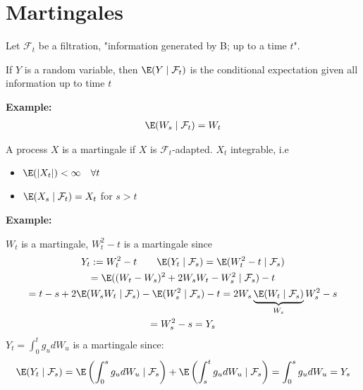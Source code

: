 \section{Martingales}
Let $\mathcal{F}_t$ be a filtration, "information generated by B; up to a time $t$".\par
\noindent If $Y$ is a random variable, then $\E(Y\mid \mathcal{F}_t)$ is the conditional expectation given all information up to time $t$
\par\bigskip
\noindent\textbf{Example:}
\begin{equation*}
  \begin{gathered}
    \E(W_s\mid\mathcal{F}_t) = W_t
  \end{gathered}
\end{equation*}
\par\bigskip
\begin{defo}[Martingale]{} 
  A process $X$ is a martingale if $X$ is $\mathcal{F}_t$-adapted. $X_t$ integrable, i.e\par
  \begin{itemize}
    \item $\E(\left|X_t\right|)<\infty\quad\forall t$
    \item $\E(X_s\mid\mathcal{F}_t) = X_t$ for $s>t$
  \end{itemize}
\end{defo}
\par\bigskip
\noindent\textbf{Example:}\par
\noindent $W_t$ is a martingale, $W_t^2-t$ is a martingale since
\begin{equation*}
  \begin{gathered}
    Y_t := W_t^2-t\qquad \E(Y_t\mid\mathcal{F}_s) = \E(W_t^2-t\mid\mathcal{F}_s)\\
    = \E((W_t-W_s)^2+2W_sW_t-W_s^2\mid\mathcal{F}_s)-t\\
    = t-s+2\E(W_sW_t\mid\mathcal{F}_s)-\E(W_s^2\mid\mathcal{F}_s)-t = 2W_s\underbrace{\E(W_t\mid\mathcal{F}_s)}_{W_s}W_s^2-s\\
    = W_s^2-s = Y_s
  \end{gathered}
\end{equation*}
\noindent $Y_t = \int_{0}^{t}g_udW_u$ is a martingale since:
\begin{equation*}
  \begin{gathered}
    \E(Y_t\mid\mathcal{F}_s) = \E\left(\int_{0}^{s}g_udW_u\mid\mathcal{F}_s\right)+\E\left(\int_{s}^{t}g_udW_u\mid\mathcal{F}_s\right) = \int_{0}^{s}g_udW_u = Y_s
  \end{gathered}
\end{equation*}\par

